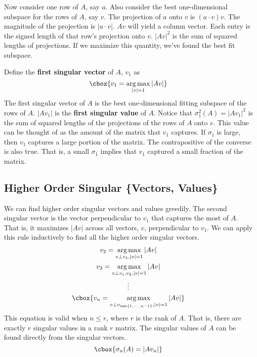 \documentclass{hw}
\renewcommand\emph[1]{{\bf\color{Blue}#1}}
\DeclareMathOperator*{\argmax}{arg\,max}
\begin{document}
Now consider one row of $A$, say $a$. Also consider the best one-dimensional
subspace for the rows of $A$, say $v$. The projection of $a$ onto $v$ is $(a
\cdot v)v$. The magnitude of the projection is $|a \cdot v|$. $Av$ will yield a
column vector. Each entry is the signed length of that row's projection onto
$v$. $|Av|^2$ is the sum of squared lengths of projections. If we maximize this
quantity, we've found the best fit subspace.

Define the \emph{first singular vector} of $A$, $v_1$ as
\[\cbox{
  v_1 = \argmax_{|v|=1}|Av|
}\]
The first singular vector of $A$ is the best one-dimensional fitting subspace
of the rows of $A$. $|Av_1|$ is the \emph{first singular value} of $A$. Notice
that $\sigma_1^2(A) = |Av_1|^2$ is the sum of squared lengths of the
projections of the rows of $A$ onto $v$. This value can be thought of as the
amount of the matrix that $v_1$ captures. If $\sigma_1$ is large, then $v_1$
captures a large portion of the matrix. The contrapositive of the converse is
also true. That is, a small $\sigma_1$ implies that $v_1$ captured a small
fraction of the matrix.

\subsection{Higher Order Singular \{Vectors, Values\}}
We can find higher order singular vectors and values greedily. The second
singular vector is the vector perpendicular to $v_1$ that captures the most of
$A$. That is, it maximizes $|Av|$ across all vectors, $v$, perpendicular to
$v_1$. We can apply this rule inductively to find all the higher order singular vectors.
\begin{gather*}
  v_2 = \argmax_{v \perp v_1, |v| = 1} |Av| \\
  v_3 = \argmax_{v \perp v_1,v_2, |v| = 1} |Av| \\
  \vdots \\
  \cbox{v_n = \argmax_{v \perp v_{\set{1,\cdots,n-1}}, |v| = 1} |Av|}
\end{gather*}
This equation is valid when $n \leq r$, where $r$ is the rank of $A$. That is,
there are exactly $r$ singular values in a rank $r$ matrix. The singular values
of $A$ can be found directly from the singular vectors.
\[\cbox{
  \sigma_n(A) = |Av_n|
}\]
\end{document}
